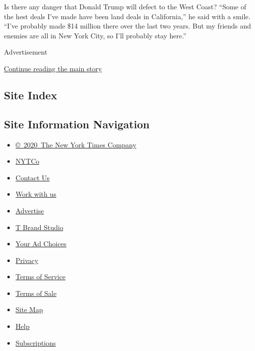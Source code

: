 Is there any danger that Donald Trump will defect to the West Coast?
``Some of the hest deals I've made have been land deals in California,''
he said with a smile. ``I've probably made \$14 million there over the
last two years. But my friends and enemies are all in New York City, so
I'll probably stay here.''

Advertisement

\protect\hyperlink{after-bottom}{Continue reading the main story}

\hypertarget{site-index}{%
\subsection{Site Index}\label{site-index}}

\hypertarget{site-information-navigation}{%
\subsection{Site Information
Navigation}\label{site-information-navigation}}

\begin{itemize}
\tightlist
\item
  \href{https://help.nytimes3xbfgragh.onion/hc/en-us/articles/115014792127-Copyright-notice}{©~2020~The
  New York Times Company}
\end{itemize}

\begin{itemize}
\tightlist
\item
  \href{https://www.nytco.com/}{NYTCo}
\item
  \href{https://help.nytimes3xbfgragh.onion/hc/en-us/articles/115015385887-Contact-Us}{Contact
  Us}
\item
  \href{https://www.nytco.com/careers/}{Work with us}
\item
  \href{https://nytmediakit.com/}{Advertise}
\item
  \href{http://www.tbrandstudio.com/}{T Brand Studio}
\item
  \href{https://www.nytimes3xbfgragh.onion/privacy/cookie-policy\#how-do-i-manage-trackers}{Your
  Ad Choices}
\item
  \href{https://www.nytimes3xbfgragh.onion/privacy}{Privacy}
\item
  \href{https://help.nytimes3xbfgragh.onion/hc/en-us/articles/115014893428-Terms-of-service}{Terms
  of Service}
\item
  \href{https://help.nytimes3xbfgragh.onion/hc/en-us/articles/115014893968-Terms-of-sale}{Terms
  of Sale}
\item
  \href{https://spiderbites.nytimes3xbfgragh.onion}{Site Map}
\item
  \href{https://help.nytimes3xbfgragh.onion/hc/en-us}{Help}
\item
  \href{https://www.nytimes3xbfgragh.onion/subscription?campaignId=37WXW}{Subscriptions}
\end{itemize}
